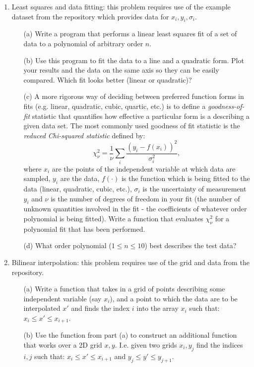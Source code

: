 \documentclass{article}
\begin{document}
\begin{enumerate}
  \item Least squares and data fitting:  this problem requires use of the example dataset from the repository which provides data for $x_i,y_i,\sigma_i$.  
  \begin{itemize}
    \item[(a)] Write a program that performs a linear least squares fit of a set of data to a polynomial of arbitrary order $n$.
    \item[(b)] Use this program to fit the data to a line and a quadratic form.  Plot your results and the data on the same axis so they can be easily compared.  Which fit looks better (linear or quadratic)?  
    \item[(c)] A more rigorous way of deciding between preferred function forms in fits (e.g. linear, quadratic, cubic, quartic, etc.) is to define a \emph{goodness-of-fit} statistic that quantifies how effective a particular form is a describing a given data set.  The most commonly used goodness of fit statistic is the \emph{reduced Chi-squared statistic} defined by:  
    \begin{equation}
      \chi^2_\nu = \frac{1}{\nu} \sum_i \frac{\left( y_i - f(x_i) \right) ^2}{\sigma_i^2},
    \end{equation}
    where $x_i$ are the points of the independent variable at which data are sampled, $y_i$ are the data, $f(\cdot)$ is the function which is being fitted to the data (linear, quadratic, cubic, etc.), $\sigma_i$ is the uncertainty of measurement $y_i$ and $\nu$ is the number of degrees of freedom in your fit (the number of unknown quantities involved in the fit - the coefficients of whatever order polynomial is being fitted).  Write a function that evaluates $\chi^2_\nu$ for a polynomial fit that has been performed.  
    \item[(d)] What order polynomial ($1 \le n \le 10$) best describes the test data?  
  \end{itemize}
  \item Bilinear interpolation:  this problem requires use of the grid and data from the repository.  
  \begin{itemize}
    \item[(a)]  Write a function that takes in a grid of points describing some independent variable (say $x_i$), and a point to which the data are to be interpolated $x'$ and finds the index $i$ into the array $x_i$ such that:  $x_i \le x' \le x_{i+1}$.  
    \item[(b)]  Use the function from part (a) to construct an additional function that works over a 2D grid $x,y$.  I.e. given two grids $x_i,y_j$ find the indices $i,j$ such that:  $x_i \le x' \le x_{i+1}$ and $y_j \le y' \le y_{j+1}$.

\end{itemize}
\end{enumerate}
\end{document}
